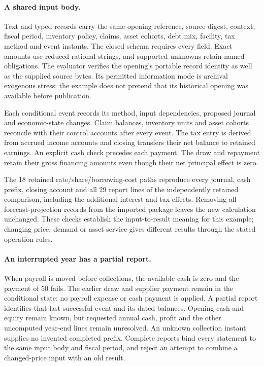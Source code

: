 \paragraph{A shared input body.}
Text and typed records carry the same opening reference, source digest,
context, fiscal period, inventory policy, claims, asset cohorts, debt mix,
facility, tax method and event instants. The closed schema requires every
field. Exact amounts use reduced rational strings, and supported unknowns
retain named obligations. The evaluator verifies the opening's portable
record identity as well as the supplied source bytes. Its permitted
information mode is archival exogenous stress: the example does not pretend
that its historical opening was available before publication.

Each conditional event records its method, input dependencies, proposed
journal and economic-state changes. Claim balances, inventory units and
asset cohorts reconcile with their control accounts after every event. The
tax entry is derived from accrued income accounts and closing transfers
their net balance to retained earnings. An explicit cash check precedes
each payment. The draw and repayment retain their gross financing amounts
even though their net principal effect is zero.

The 18 retained rate/share/borrowing-cost paths reproduce every journal,
cash prefix, closing account and all 29 report lines of the independently
retained comparison, including the additional interest and tax effects.
Removing all forecast-projection records from the imported package leaves
the new calculation unchanged. These checks establish the input-to-result
meaning for this example; changing price, demand or asset service gives
different results through the stated operation rules.

\paragraph{An interrupted year has a partial report.}
When payroll is moved before collections, the available cash is zero and
the payment of 50 fails. The earlier draw and supplier payment remain in
the conditional state; no payroll expense or cash payment is applied. A
partial report identifies that last successful event and its dated balances.
Opening cash and equity remain known, but requested annual cash, profit
and the other uncomputed year-end lines remain unresolved. An unknown
collection instant supplies no invented completed prefix. Complete reports
bind every statement to the same input body and fiscal period, and reject
an attempt to combine a changed-price input with an old result.

